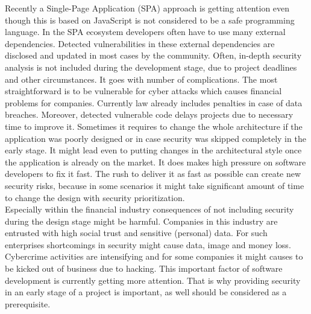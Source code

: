 \documentclass{article} %
\begin{document}
\justifying Recently a Single-Page Application (SPA) approach is getting attention even though this is based on JavaScript is not considered to be a safe programming language. In the SPA ecosystem developers often have to use many external dependencies. Detected vulnerabilities in these external dependencies are disclosed and updated in most cases by the community. Often, in-depth security analysis is not included during the development stage, due to project deadlines and other circumstances. It goes with number of complications. The most straightforward is to be vulnerable for cyber attacks which causes financial problems for companies. Currently law already includes penalties in case of data breaches. Moreover, detected vulnerable code delays projects due to necessary time to improve it. Sometimes it requires to change the whole architecture if the application was poorly designed or in case security was skipped completely in the early stage. It might lead even to putting changes in the architectural style once the application is already on the market. It does makes high pressure on software developers to fix it fast. The rush to deliver it as fast as possible can create new security risks, because in some scenarios it might take significant amount of time to change the design with security prioritization.\\
\newline
Especially within the financial industry consequences of not including security during the design stage might be harmful. Companies in this industry are entrusted with high social trust and sensitive (personal) data. For such enterprises shortcomings in security might cause data, image and money loss. Cybercrime activities are intensifying and for some companies it might causes to be kicked out of business due to hacking. This important factor of software development is currently getting more attention. That is why providing security in an early stage of a project is important, as well should be considered as a prerequisite.\\
\newline
\end{document}
